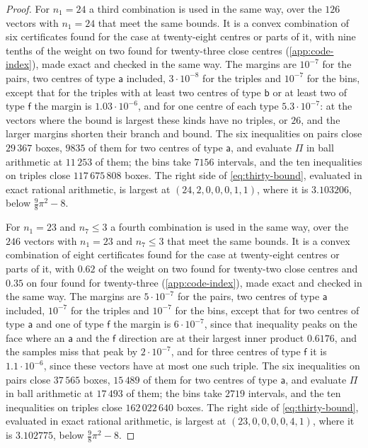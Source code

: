 \documentclass[11pt,reqno]{amsart}
\renewcommand{\_}{\origunderscore\allowbreak}
\numberwithin{equation}{section}
\theoremstyle{plain}
\theoremstyle{definition}
\theoremstyle{remark}
\begin{document}
\begin{proof}
For $n_1=24$ a third combination is used in the same way, over the $126$
vectors with $n_1=24$ that meet the same bounds. It is a convex combination
of six certificates found for the case at twenty-eight centres or parts of
it, with nine tenths of the weight on two found for twenty-three close
centres (\cref{app:code-index}), made exact and checked in the same way. The
margins are $10^{-7}$ for the pairs, two centres of type $\mathsf a$
included, $3\cdot10^{-8}$ for the triples and $10^{-7}$ for the bins, except
that for the triples with at least two centres of type $\mathsf b$ or at
least two of type $\mathsf f$ the margin is $1.03\cdot10^{-6}$, and for one
centre of each type $5.3\cdot10^{-7}$: at the vectors where the bound is
largest these kinds have no triples, or $26$, and the larger margins shorten
their branch and bound. The six inequalities on pairs close $29\,367$ boxes,
$9835$ of them for two centres of type $\mathsf a$, and evaluate $\Pi$ in
ball arithmetic at $11\,253$ of them; the bins take $7156$ intervals, and the
ten inequalities on triples close $117\,675\,808$ boxes. The right side of
\eqref{eq:thirty-bound}, evaluated in exact rational arithmetic, is largest
at $(24,2,0,0,0,1,1)$, where it is $3.103206$, below $\frac98\pi^2-8$.

For $n_1=23$ and $n_7\le3$ a fourth combination is used in the same way,
over the $246$ vectors with $n_1=23$ and $n_7\le3$ that meet the same
bounds. It is a convex combination of eight certificates found for the case
at twenty-eight centres or parts of it, with $0.62$ of the weight on two
found for twenty-two close centres and $0.35$ on four found for twenty-three
(\cref{app:code-index}), made exact and checked in the same way. The margins
are $5\cdot10^{-7}$ for the pairs, two centres of type $\mathsf a$
included, $10^{-7}$ for the triples and $10^{-7}$ for the bins, except that
for two centres of type $\mathsf a$ and one of type $\mathsf f$ the margin
is $6\cdot10^{-7}$, since that inequality peaks on the face where an
$\mathsf a$ and the $\mathsf f$ direction are at their largest inner
product $0.6176$, and the samples miss that peak by $2\cdot10^{-7}$, and
for three centres of
type $\mathsf f$ it is $1.1\cdot10^{-6}$, since these vectors have at most
one such triple. The six inequalities on pairs close $37\,565$ boxes,
$15\,489$ of them for two centres of type $\mathsf a$, and evaluate $\Pi$
in ball arithmetic at $17\,493$ of them; the bins take $2719$ intervals, and
the ten inequalities on triples close $162\,022\,640$ boxes. The right side
of \eqref{eq:thirty-bound}, evaluated in exact rational arithmetic, is
largest at $(23,0,0,0,0,4,1)$, where it is $3.102775$, below
$\frac98\pi^2-8$.


\end{proof}
\end{document}
